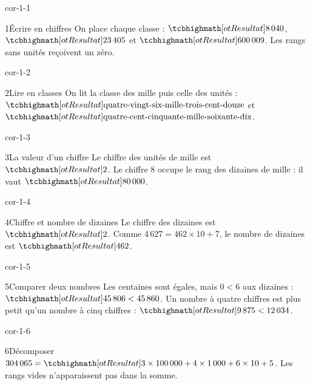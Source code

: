 \clearpage\pagestyle{otMain}\setlength{\otBlocEspacement}{2.5mm}\fontsize{11}{15}\selectfont{}
\begin{blocLivre}{cor-1-1}\begin{corrige}{1}{Écrire en chiffres}
On place chaque classe : $\res{8\,040}$, $\res{23\,405}$ et $\res{600\,009}$. Les rangs sans unités reçoivent un zéro.
\end{corrige}\end{blocLivre}
\begin{blocLivre}{cor-1-2}\begin{corrige}{2}{Lire en classes}
On lit la classe des mille puis celle des unités : $\res{\text{quatre-vingt-six-mille-trois-cent-douze}}$ et $\res{\text{quatre-cent-cinquante-mille-soixante-dix}}$.
\end{corrige}\end{blocLivre}
\begin{blocLivre}{cor-1-3}\begin{corrige}{3}{La valeur d’un chiffre}
Le chiffre des unités de mille est $\res2$. Le chiffre 8 occupe le rang des dizaines de mille : il vaut $\res{80\,000}$.
\end{corrige}\end{blocLivre}
\begin{blocLivre}{cor-1-4}\begin{corrige}{4}{Chiffre et nombre de dizaines}
Le chiffre des dizaines est $\res2$. Comme $4\,627=462\times10+7$, le nombre de dizaines est $\res{462}$.
\end{corrige}\end{blocLivre}
\begin{blocLivre}{cor-1-5}\begin{corrige}{5}{Comparer deux nombres}
Les centaines sont égales, mais $0<6$ aux dizaines : $\res{45\,806<45\,860}$. Un nombre à quatre chiffres est plus petit qu’un nombre à cinq chiffres : $\res{9\,875<12\,034}$.
\end{corrige}\end{blocLivre}
\begin{blocLivre}{cor-1-6}\begin{corrige}{6}{Décomposer}
$304\,065=\res{3\times100\,000+4\times1\,000+6\times10+5}$. Les rangs vides n’apparaissent pas dans la somme.
\end{corrige}\end{blocLivre}
